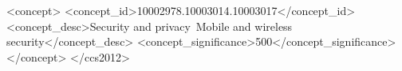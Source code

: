 \documentclass[sigconf]{acmart}
\begin{document}


\renewcommand{\shortauthors}{}





\begin{CCSXML}
   <concept>
       <concept_id>10002978.10003014.10003017</concept_id>
       <concept_desc>Security and privacy~Mobile and wireless security</concept_desc>
       <concept_significance>500</concept_significance>
       </concept>
 </ccs2012>
\end{CCSXML}
\end{document}

